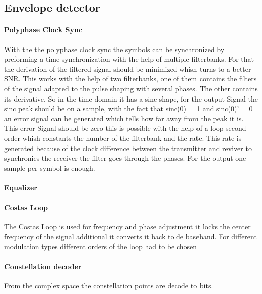 \subsection{Envelope detector}

\paragraph{Polyphase Clock Sync}
With the the polyphase clock sync the symbols can be synchronized by preforming a time synchronization with the help of multiple filterbanks. For that the derivation of the filtered signal should be minimized whish turns to a better SNR. This works with the help of two filterbanks, one of them contains the filters of the signal adapted to the pulse shaping with several phases. The other contains its derivative. So in the time domain it has a sinc shape, for the output Signal the sinc peak should be on a sample, with the fact that sinc(0) = 1 and sinc(0)' = 0 an error signal can be generated which tells how far away from the peak it is. This error Signal should be zero this is possible with the help of a loop second order whish constants the number of the filterbank and the rate. This rate is generated because of the clock difference between the transmitter and reviver to synchronies the receiver the filter goes through the phases. For the output one sample per symbol is enough.

\paragraph{Equalizer}

\paragraph{Costas Loop}

The Costas Loop is used for frequency and phase adjustment it locks the center frequency of the signal additional it converts it back to de baseband.  For different modulation types different orders of the loop had to be chosen 

\paragraph{Constellation decoder}

From the complex space the constellation points are decode to bits.

